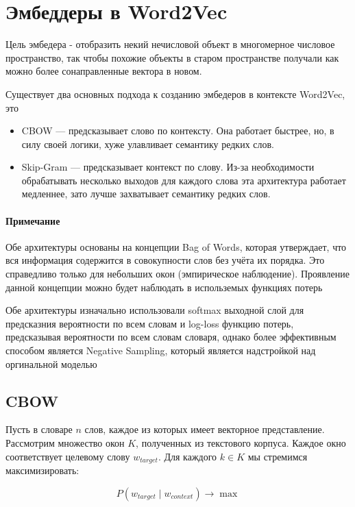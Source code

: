 \documentclass{article}
\begin{document}
    \section{Эмбеддеры в Word2Vec}
    Цель эмбедера - отобразить некий нечисловой объект в многомерное числовое пространство, так чтобы похожие 
    объекты в старом пространстве получали как можно более сонаправленные вектора в новом. 

    Существует два основных подхода к созданию эмбедеров в контексте Word2Vec, это 
    \begin{itemize}
        \item CBOW --- предсказывает слово по контексту. 
        Она работает быстрее, но, в силу своей логики, хуже улавливает семантику редких слов.
        \item Skip-Gram --- предсказывает контекст по слову. 
        Из-за необходимости обрабатывать несколько выходов для каждого слова 
        эта архитектура работает медленнее, зато лучше захватывает семантику редких слов.  
    \end{itemize}
    
    \paragraph*{Примечание}  
    Обе архитектуры основаны на концепции Bag of Words, которая утверждает, что 
    вся информация содержится в совокупности слов без учёта их порядка. Это справедливо только для небольших окон (эмпирическое наблюдение). Проявление 
    данной концепции можно будет наблюдать в использемых функциях потерь

    Обе архитектуры изначально использовали softmax выходной слой для предсказния вероятности по всем словам и log-loss 
    функцию потерь, предсказывая вероятности по всем словам словаря, однако более эффективным способом является Negative Sampling, 
    который является надстройкой над оргинальной моделью

    \subsection{CBOW}  
    Пусть в словаре \( n \) слов, каждое из которых имеет векторное представление. Рассмотрим множество окон \( K \), полученных из текстового корпуса. Каждое окно соответствует целевому слову \( w_{target} \). Для каждого \( k \in K \) мы стремимся максимизировать:  
    
    \[
    P(w_{target} \mid w_{context}) \rightarrow \max
    \]  
    
\end{document}
